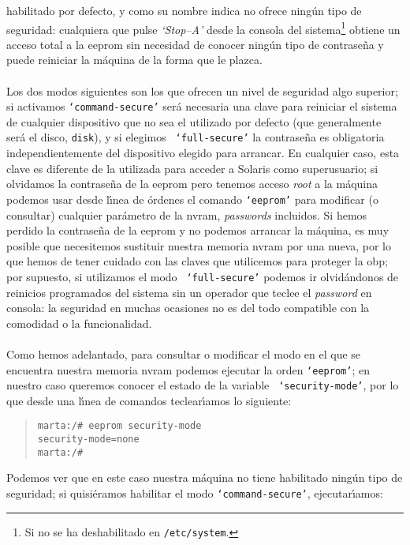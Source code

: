habilitado por defecto, y como su nombre indica no ofrece ning\'un tipo de 
seguridad: cualquiera que pulse {\it `Stop--A'} desde la consola del 
sistema\footnote{Si no se ha deshabilitado en {\tt /etc/system}.}
obtiene un acceso total a la {\sc eeprom} sin necesidad de conocer ning\'un
tipo de contrase\~na y puede reiniciar la m\'aquina de la forma que le plazca.\\
\\Los dos modos siguientes son los que ofrecen un nivel de seguridad algo
superior; si activamos {\tt `command-secure'} ser\'a necesaria una clave para
reiniciar el sistema de cualquier dispositivo que no sea el utilizado por 
defecto (que generalmente ser\'a el disco, {\tt disk}), y si elegimos {\tt
`full-secure'} la contrase\~na es obligatoria independientemente del 
dispositivo elegido para arrancar. En cualquier caso, esta clave es diferente 
de la utilizada para acceder a Solaris como superusuario; si olvidamos la 
contrase\~na de la {\sc eeprom} pero tenemos acceso {\it root} a la m\'aquina
podemos usar desde l\'{\i}nea de \'ordenes el comando {\tt `eeprom'} para 
modificar (o consultar) cualquier par\'ametro de la {\sc nvram}, {\it 
passwords} incluidos. Si
hemos perdido la contrase\~na de la {\sc eeprom} y no podemos arrancar la 
m\'aquina, es muy posible que necesitemos sustituir nuestra memoria {\sc nvram}
por una nueva, por lo que hemos de tener cuidado con las claves que utilicemos
para proteger la {\sc obp}; por supuesto, si utilizamos el modo {\tt 
`full-secure'} podemos ir olvid\'andonos de reinicios programados del sistema
sin un operador que teclee el {\it password} en consola: la seguridad en muchas 
ocasiones no es del todo compatible con la comodidad o la funcionalidad.\\
\\Como hemos adelantado, para consultar o modificar el modo en el que se 
encuentra nuestra memoria {\sc nvram} podemos ejecutar la orden {\tt `eeprom'};
en nuestro caso queremos conocer el estado de la variable {\tt 
`security-mode'}, por lo que desde una l\'{\i}nea de comandos teclear\'{\i}amos
lo siguiente:
\begin{quote}
\begin{verbatim}
marta:/# eeprom security-mode
security-mode=none
marta:/# 
\end{verbatim}
\end{quote}
Podemos ver que en este caso nuestra m\'aquina no tiene habilitado ning\'un
tipo de seguridad; si quisi\'eramos habilitar el modo  {\tt `command-secure'},
ejecutar\'{\i}amos:
